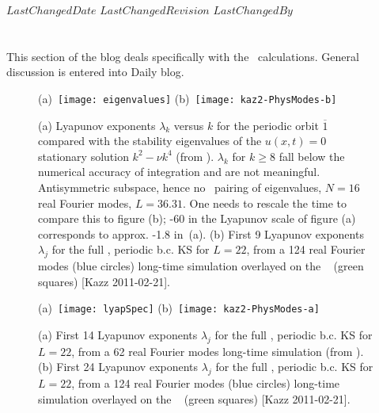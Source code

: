 \ifsvnmulti
 {$LastChangedDate$}
 {$LastChangedRevision$} {$LastChangedBy$}
\fi

\chapter{\KS}
\label{sect:LyapKS}

This section of the blog deals specifically with the
\KS\ calculations. General discussion is entered into
 {Daily blog}.

\begin{figure}
 (a)~\texttt{[image: eigenvalues]}
 (b)~\texttt{[image: kaz2-PhysModes-b]}
\caption{
(a)
Lyapunov exponents $\lambda_k$ versus $k$ for the periodic
orbit $\overline{1}$ compared with  the stability eigenvalues
of the $u(x,t)=0$ stationary solution $k^2- \nu k^4$ (from
). $\lambda_k$ for $k \geq 8$ fall
below the numerical accuracy of integration and are not
meaningful. Antisymmetric subspace,
hence no \ pairing of eigenvalues, $N=16$ real Fourier
modes, $L=36.31$. One needs to rescale the time to compare
this to figure (b); -60 in the Lyapunov scale of figure (a)
corresponds to approx. -1.8 in \,(a).
(b)
First 9 Lyapunov exponents $\lambda_j$ for the full
\statesp, periodic b.c. KS for $L=22$, from a 124 real Fourier
modes (blue circles) long-time simulation overlayed on
the \po\  (green squares) [Kazz 2011-02-21].
}
\label{fig:lyapSpec1}
\end{figure}

\begin{figure}
 (a)~\texttt{[image: lyapSpec]}
 (b)~\texttt{[image: kaz2-PhysModes-a]}
\caption{
(a)
First 14 Lyapunov exponents $\lambda_j$ for the full
\statesp, periodic b.c. KS for $L=22$, from a 62 real Fourier
modes long-time simulation (from ).
(b)
First 24 Lyapunov exponents $\lambda_j$ for the full
\statesp, periodic b.c. KS for $L=22$, from a 124 real Fourier
modes (blue circles) long-time simulation overlayed on
the \po\  (green squares) [Kazz 2011-02-21].
}
\label{fig:lyapSpec}
\end{figure}


